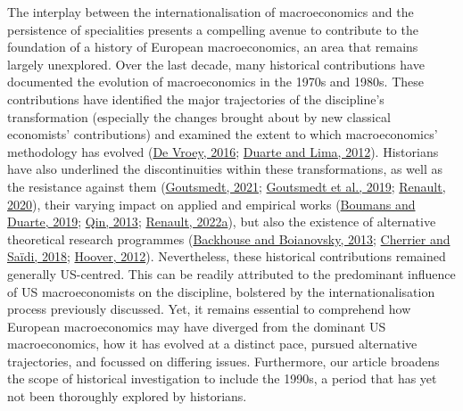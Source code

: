 \documentclass[
  12pt,
  onecolumn]{article}
\begin{document}
The interplay between the internationalisation of macroeconomics and the
persistence of specialities presents a compelling avenue to contribute
to the foundation of a history of European macroeconomics, an area that
remains largely unexplored. Over the last decade, many historical
contributions have documented the evolution of macroeconomics in the
1970s and 1980s. These contributions have identified the major
trajectories of the discipline's transformation (especially the changes
brought about by new classical economists' contributions) and examined
the extent to which macroeconomics' methodology has evolved
(\protect\hyperlink{ref-devroey2016}{De Vroey, 2016};
\protect\hyperlink{ref-duartelima2012a}{Duarte and Lima, 2012}).
Historians have also underlined the discontinuities within these
transformations, as well as the resistance against them
(\protect\hyperlink{ref-goutsmedt2021b}{Goutsmedt, 2021};
\protect\hyperlink{ref-goutsmedtetal2019}{Goutsmedt et al., 2019};
\protect\hyperlink{ref-renault2020a}{Renault, 2020}), their varying
impact on applied and empirical works
(\protect\hyperlink{ref-boumans2019}{Boumans and Duarte, 2019};
\protect\hyperlink{ref-qin2013a}{Qin, 2013};
\protect\hyperlink{ref-renault2022}{Renault, 2022a}), but also the
existence of alternative theoretical research programmes
(\protect\hyperlink{ref-backhouseboianovski2013}{Backhouse and
Boianovsky, 2013}; \protect\hyperlink{ref-cherrier2018c}{Cherrier and
Saïdi, 2018}; \protect\hyperlink{ref-hoover2012}{Hoover, 2012}).
Nevertheless, these historical contributions remained generally
US-centred. This can be readily attributed to the predominant influence
of US macroeconomists on the discipline, bolstered by the
internationalisation process previously discussed. Yet, it remains
essential to comprehend how European macroeconomics may have diverged
from the dominant US macroeconomics, how it has evolved at a distinct
pace, pursued alternative trajectories, and focussed on differing
issues. Furthermore, our article broadens the scope of historical
investigation to include the 1990s, a period that has yet not been
thoroughly explored by historians.
\end{document}
